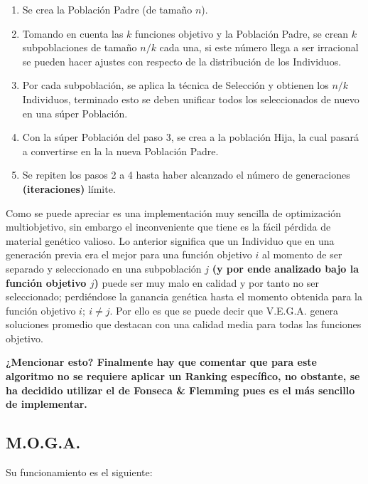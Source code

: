 \documentclass[class=report, crop=false]{standalone}
\begin{document}
\begin{enumerate} 
\item Se crea la Población Padre (de tamaño \(n\)).
\item Tomando en cuenta las \(k\) funciones objetivo y la Población Padre, se crean \(k\) subpoblaciones de tamaño \(n/k\) cada una, si este número llega a ser irracional se pueden hacer ajustes con respecto de la distribución de los Individuos.
\item Por cada subpoblación, se aplica la técnica de Selección y obtienen los \(n/k\) Individuos, terminado esto se deben unificar todos los seleccionados de nuevo en una súper Población.
\item Con la súper Población del paso 3, se crea a la población Hija, la cual pasará a convertirse en la la nueva Población Padre.
\item Se repiten los pasos 2 a 4 hasta haber alcanzado el número de generaciones \textbf{(iteraciones)} límite.
\end{enumerate}

Como se puede apreciar es una implementación muy sencilla 
de optimización multiobjetivo, sin embargo el inconveniente 
que tiene es la fácil pérdida de material genético valioso.\break
Lo anterior significa que un Individuo que en una generación 
previa era el mejor para una función objetivo \(i\) al momento 
de ser separado y seleccionado en una subpoblación \(j\) \textbf{(y por ende analizado bajo la función objetivo \(j\))} 
puede ser muy malo en calidad y por tanto no ser seleccionado;
perdiéndose la ganancia genética hasta el momento obtenida para 
la función objetivo \(i;\ i \neq j\).\medskip\break
Por ello es que se puede decir que V.E.G.A. genera soluciones 
promedio que destacan con una calidad media para todas las 
funciones objetivo.\medskip\break

\textbf{¿Mencionar esto?
Finalmente hay que comentar que para este algoritmo no se requiere 
aplicar un Ranking específico, no obstante, se ha decidido utilizar 
el de Fonseca \& Flemming pues es el más sencillo de implementar.}

\subsection{M.O.G.A.}
Su funcionamiento es el siguiente:
\end{document}
